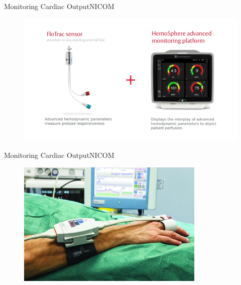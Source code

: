 \documentclass{beamer}
\begin{document}
	\begin{frame}{Monitoring Cardiac Output}{NICOM}
		\begin{figure}
			\centering
			\includegraphics[width=1.0\textwidth]{figures/nicom-flotrac}
			\label{fig:nicom-flotrac}
		\end{figure}
	\end{frame}
	\begin{frame}{Monitoring Cardiac Output}{NICOM}
		\begin{figure}
			\centering
			\includegraphics[width=0.8\textwidth]{figures/nicom-lidcorapid}
			\label{fig:nicom-lidocopaid}
		\end{figure}
	\end{frame}
\end{document}

